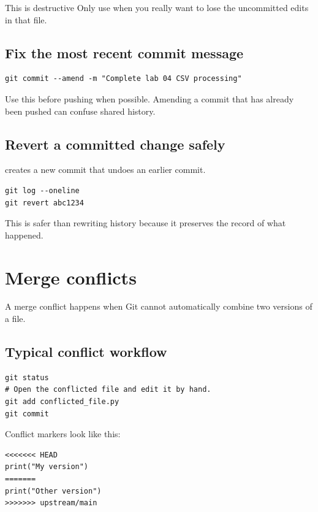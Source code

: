 \documentclass[11pt]{article}
\begin{document}
\begin{warningbox}{This is destructive}
Only use  when you really want to lose the uncommitted edits in that file.
\end{warningbox}

\subsection{Fix the most recent commit message}

\begin{lstlisting}[style=terminal]
git commit --amend -m "Complete lab 04 CSV processing"
\end{lstlisting}

Use this before pushing when possible.  Amending a commit that has already been pushed can confuse shared history.

\subsection{Revert a committed change safely}
 creates a new commit that undoes an earlier commit.

\begin{lstlisting}[style=terminal]
git log --oneline
git revert abc1234
\end{lstlisting}

This is safer than rewriting history because it preserves the record of what happened.

\section{Merge conflicts}

A merge conflict happens when Git cannot automatically combine two versions of a file.

\subsection{Typical conflict workflow}

\begin{lstlisting}[style=terminal]
git status
# Open the conflicted file and edit it by hand.
git add conflicted_file.py
git commit
\end{lstlisting}

Conflict markers look like this:

\begin{lstlisting}[style=terminal]
<<<<<<< HEAD
print("My version")
=======
print("Other version")
>>>>>>> upstream/main
\end{lstlisting}
\end{document}
